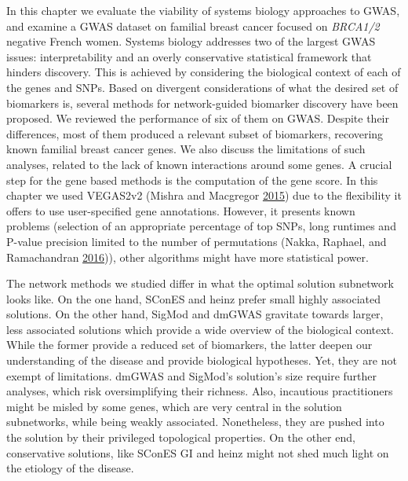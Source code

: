 \documentclass[
  11pt,
]{env/yjiao}
\begin{document}
In this chapter we evaluate the viability of systems biology approaches
to GWAS, and examine a GWAS dataset on familial breast cancer focused on
\emph{BRCA1/2} negative French women. Systems biology addresses two of the
largest GWAS issues: interpretability and an overly conservative
statistical framework that hinders discovery. This is achieved by
considering the biological context of each of the genes and SNPs. Based
on divergent considerations of what the desired set of biomarkers is,
several methods for network-guided biomarker discovery have been
proposed. We reviewed the performance of six of them on GWAS. Despite
their differences, most of them produced a relevant subset of
biomarkers, recovering known familial breast cancer genes. We also
discuss the limitations of such analyses, related to the lack of known
interactions around some genes. A crucial step for the gene based
methods is the computation of the gene score. In this chapter we used
VEGAS2v2 (Mishra and Macgregor \protect\hyperlink{ref-mishra_vegas2:_2015}{2015}) due to the flexibility it offers to use
user-specified gene annotations. However, it presents known problems
(selection of an appropriate percentage of top SNPs, long runtimes and
P-value precision limited to the number of permutations
(Nakka, Raphael, and Ramachandran \protect\hyperlink{ref-nakka_gene_2016}{2016})), other algorithms might have more statistical power.

The network methods we studied differ in what the optimal solution
subnetwork looks like. On the one hand, SConES and heinz prefer small
highly associated solutions. On the other hand, SigMod and dmGWAS
gravitate towards larger, less associated solutions which provide a wide
overview of the biological context. While the former provide a reduced
set of biomarkers, the latter deepen our understanding of the disease
and provide biological hypotheses. Yet, they are not exempt of limitations.
dmGWAS and SigMod's solution's size require further analyses, which risk
oversimplifying their richness. Also, incautious practitioners might be
misled by some genes, which are very central in the solution
subnetworks, while being weakly associated. Nonetheless, they are pushed
into the solution by their privileged topological properties. On the
other end, conservative solutions, like SConES GI and heinz might not
shed much light on the etiology of the disease.
\end{document}
